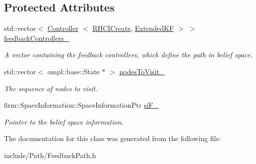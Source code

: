 \subsection*{\-Protected \-Attributes}
\begin{DoxyCompactItemize}
\item 
\hypertarget{class_feedback_path_acc635307df317b85241b4ea93642bf57}{std\-::vector$<$ \hyperlink{class_controller}{\-Controller}\*
$<$ \hyperlink{class_r_h_c_i_create}{\-R\-H\-C\-I\-Create}, \hyperlink{class_extended_k_f}{\-Extended\-K\-F} $>$ $>$ \hyperlink{class_feedback_path_acc635307df317b85241b4ea93642bf57}{feedback\-Controllers\-\_\-}}\label{class_feedback_path_acc635307df317b85241b4ea93642bf57}

\begin{DoxyCompactList}\small\item\em \-A vector containing the feedback controllers, which define the path in belief space. \end{DoxyCompactList}\item 
\hypertarget{class_feedback_path_a6efa9a9ed1e8bf5b784308308feceec7}{std\-::vector$<$ ompl\-::base\-::\-State $\ast$ $>$ \hyperlink{class_feedback_path_a6efa9a9ed1e8bf5b784308308feceec7}{nodes\-To\-Visit\-\_\-}}\label{class_feedback_path_a6efa9a9ed1e8bf5b784308308feceec7}

\begin{DoxyCompactList}\small\item\em \-The sequence of nodes to visit. \end{DoxyCompactList}\item 
\hypertarget{class_feedback_path_a46025a3de9b291abfad72ddc37a621f2}{firm\-::\-Space\-Information\-::\-Space\-Information\-Ptr \hyperlink{class_feedback_path_a46025a3de9b291abfad72ddc37a621f2}{si\-F\-\_\-}}\label{class_feedback_path_a46025a3de9b291abfad72ddc37a621f2}

\begin{DoxyCompactList}\small\item\em \-Pointer to the belief space information. \end{DoxyCompactList}\end{DoxyCompactItemize}


\-The documentation for this class was generated from the following file\-:\begin{DoxyCompactItemize}
\item 
include/\-Path/\-Feedback\-Path.\-h\end{DoxyCompactItemize}
